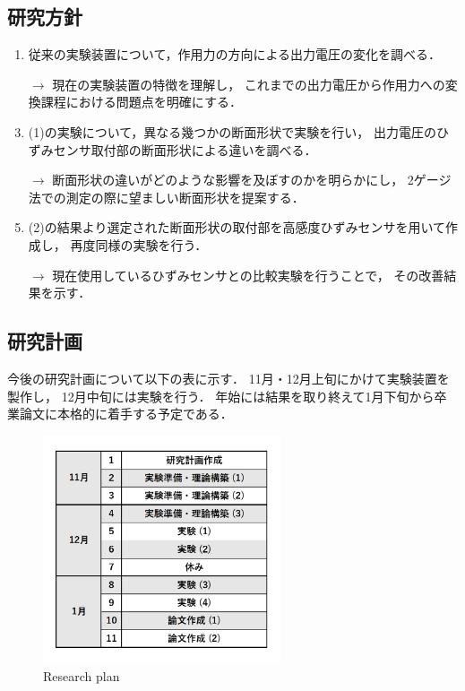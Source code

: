 \documentclass[twocolumn,a4j]{jsarticle}
\begin{document}
\subsection{研究方針}
    \begin{enumerate}[(1)]
        \item 従来の実験装置について，作用力の方向による出力電圧の変化を調べる．
        \item [$\rightarrow$] 現在の実験装置の特徴を理解し，
              これまでの出力電圧から作用力への変換課程における問題点を明確にする．
        \item (1)の実験について，異なる幾つかの断面形状で実験を行い，
              出力電圧のひずみセンサ取付部の断面形状による違いを調べる．
        \item [$\rightarrow$] 断面形状の違いがどのような影響を及ぼすのかを明らかにし，
              2ゲージ法での測定の際に望ましい断面形状を提案する．
        \item (2)の結果より選定された断面形状の取付部を高感度ひずみセンサを用いて作成し，
              再度同様の実験を行う．
        \item [$\rightarrow$] 現在使用しているひずみセンサとの比較実験を行うことで，
              その改善結果を示す．
    \end{enumerate}
\newpage
\subsection{研究計画}
今後の研究計画について以下の表に示す．
11月・12月上旬にかけて実験装置を製作し，
12月中旬には実験を行う．
年始には結果を取り終えて1月下旬から卒業論文に本格的に着手する予定である．
\begin{figure}[htbp]
    \footnotesize
    \begin{center}
        \includegraphics[width=70mm]{../images/monthly_plan.png}
        \caption{Research plan}
    \end{center}
\end{figure}
\end{document}
